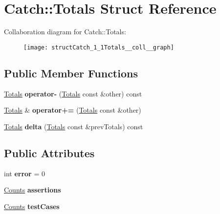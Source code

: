 \hypertarget{structCatch_1_1Totals}{}\section{Catch\+::Totals Struct Reference}
\label{structCatch_1_1Totals}


Collaboration diagram for Catch\+::Totals\+:\nopagebreak
\begin{figure}[H]
\begin{center}
\leavevmode
\texttt{[image: structCatch\_1\_1Totals\_\_coll\_\_graph]}
\end{center}
\end{figure}
\subsection*{Public Member Functions}
\begin{DoxyCompactItemize}
\item 
\mbox{\label{structCatch_1_1Totals_a9279ed39139cb7e7b291918a6d08290e}} 
\mbox{\hyperlink{structCatch_1_1Totals}{Totals}} {\bfseries operator-\/} (\mbox{\hyperlink{structCatch_1_1Totals}{Totals}} const \&other) const
\item 
\mbox{\label{structCatch_1_1Totals_a574015076e54cc405c70b053e3356e43}} 
\mbox{\hyperlink{structCatch_1_1Totals}{Totals}} \& {\bfseries operator+=} (\mbox{\hyperlink{structCatch_1_1Totals}{Totals}} const \&other)
\item 
\mbox{\label{structCatch_1_1Totals_a1a94a654f5f3786b75695e081fc9bca2}} 
\mbox{\hyperlink{structCatch_1_1Totals}{Totals}} {\bfseries delta} (\mbox{\hyperlink{structCatch_1_1Totals}{Totals}} const \&prev\+Totals) const
\end{DoxyCompactItemize}
\subsection*{Public Attributes}
\begin{DoxyCompactItemize}
\item 
\mbox{\label{structCatch_1_1Totals_a6ea14c7de7ea735a14f172a26e08a239}} 
int {\bfseries error} = 0
\item 
\mbox{\label{structCatch_1_1Totals_a885ded66df752147b30c3d45aa602ec9}} 
\mbox{\hyperlink{structCatch_1_1Counts}{Counts}} {\bfseries assertions}
\item 
\mbox{\label{structCatch_1_1Totals_adb195fe477aedee2ecea88c888f16506}} 
\mbox{\hyperlink{structCatch_1_1Counts}{Counts}} {\bfseries test\+Cases}
\end{DoxyCompactItemize}



